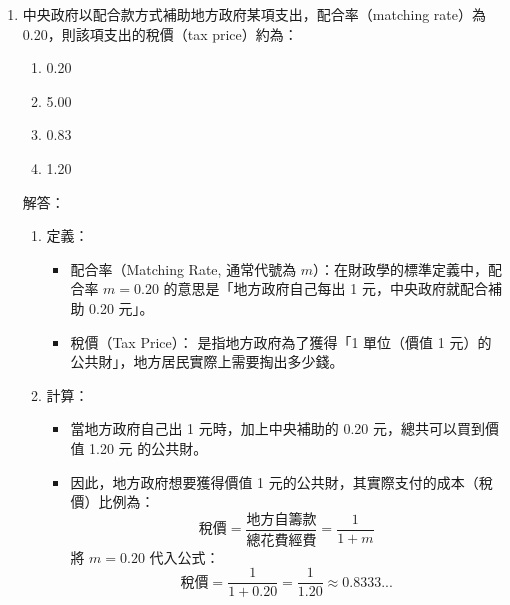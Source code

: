 \documentclass[12pt, a4paper]{article}
\begin{document}
\begin{enumerate}
    \item 中央政府以配合款方式補助地方政府某項支出，配合率（matching rate）為 0.20，則該項支出的稅價（tax price）約為：
    \begin{enumerate}[label=\Alph*.]
        \item 0.20
        \item 5.00
        \item 0.83
        \item 1.20
    \end{enumerate}
    解答：
    \begin{enumerate}[1.]
        \item 定義：
        \begin{itemize}
            \item 配合率（Matching Rate, 通常代號為 $m$）：在財政學的標準定義中，配合率 $m = 0.20$ 的意思是「地方政府自己每出 1 元，中央政府就配合補助 0.20 元」。
            \item 稅價（Tax Price）： 是指地方政府為了獲得「1 單位（價值 1 元）的公共財」，地方居民實際上需要掏出多少錢。
        \end{itemize}
        \item 計算：
        \begin{itemize}
            \item 當地方政府自己出 1 元時，加上中央補助的 0.20 元，總共可以買到價值 1.20 元 的公共財。
            \item 因此，地方政府想要獲得價值 1 元的公共財，其實際支付的成本（稅價）比例為：
            \[
            \text{稅價} = \frac{\text{地方自籌款}}{\text{總花費經費}} = \frac{1}{1 + m}
            \]
            將 $m = 0.20$ 代入公式：
            \[
            \text{稅價} = \frac{1}{1 + 0.20} = \frac{1}{1.20} \approx \mathbf{0.8333...}
            \]
        \end{itemize}
    \end{enumerate}


\end{enumerate}
\end{document}
